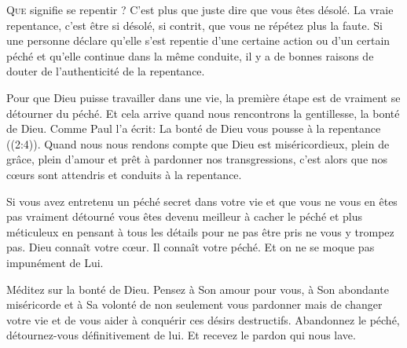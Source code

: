 \dvrule







\lettrine{Q}{ue} signifie \Og se repentir \Fg{}?
 C'est plus que juste dire que vous êtes désolé. La vraie repentance,
 c'est être si désolé, si contrit, que vous ne répétez plus la faute.
 Si une personne déclare qu'elle s'est repentie d'une certaine action
 ou d'un certain péché et qu'elle continue dans la même conduite,
 il y a de bonnes raisons de douter de l'authenticité de la repentance. 

Pour que Dieu puisse travailler dans une vie, la première étape
 est de vraiment se détourner du péché. Et cela arrive quand nous rencontrons
 la gentillesse, la bonté de Dieu. Comme Paul l'a écrit: 
 \Og La bonté de Dieu vous pousse à la repentance \Fg{} ((2:4)).
 Quand nous nous rendons compte que Dieu est miséricordieux, plein de grâce,
 plein d'amour et prêt à pardonner nos transgressions, c'est alors
 que nos c\oe{}urs sont attendris et conduits à la repentance. 


Si vous avez entretenu un péché secret dans votre vie et que vous ne vous
 en êtes pas vraiment détourné \ocadr vous êtes devenu meilleur à cacher
 le péché et plus méticuleux en pensant à tous les détails
 pour ne pas être pris \fcadr{} ne vous y trompez pas.
 Dieu connaît votre c\oe{}ur. Il connaît votre péché. Et on ne se moque pas impunément de Lui. 

Méditez sur la bonté de Dieu. Pensez à Son amour pour vous,
 à Son abondante miséricorde et à Sa volonté de non seulement
 vous pardonner mais de changer votre vie et de vous aider à conquérir
 ces désirs destructifs. Abandonnez le péché, détournez-vous définitivement
 de lui. Et recevez le pardon qui nous lave. 

\dvrule

